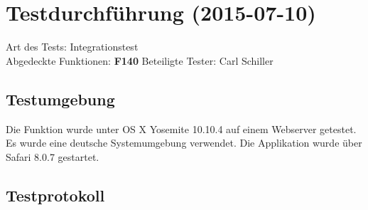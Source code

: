 
\chapter{Testdurchführung (2015-07-10)}

Art des Tests: Integrationstest\\
Abgedeckte Funktionen: \textbf{F140}
Beteiligte Tester: Carl Schiller\\

\section{Testumgebung}

Die Funktion wurde unter OS X Yosemite 10.10.4 auf einem Webserver  getestet. Es wurde eine deutsche Systemumgebung verwendet. Die Applikation wurde über Safari 8.0.7 gestartet.

\section{Testprotokoll}

